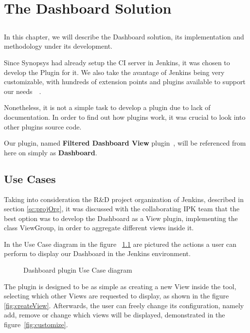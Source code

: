 \chapter{The Dashboard Solution}\label{ch:solution}

\section*{}

In this chapter, we will describe the Dashboard solution, its implementation and methodology under its development.

Since Synopsys had already setup the CI server in Jenkins, it was chosen to develop the Plugin for it. We also take the avantage of Jenkins being very customizable, with hundreds of extension points and plugins available to support our needs~\cite{kn:Jenkins}~\cite{jnks:extensionpoints}.

Nonetheless, it is not a simple task to develop a plugin due to lack of documentation. In order to find out how plugins work, it was crucial to look into other plugins source code.

Our plugin, named \textbf{Filtered Dashboard View} plugin~\cite{jksn:myplugin}, will be referenced from here on simply as \textbf{Dashboard}.

\section{Use Cases}\label{sc:usecases}

Taking into consideration the R\&D project organization of Jenkins, described in section \ref{sc:projOrg}, it was discussed with the collaborating IPK team that the best option was to develop the Dashboard as a View plugin, implementing the class ViewGroup, in order to aggregate different views inside it.

In the Use Case diagram in the figure ~\ref{fig:usecases} are pictured the actions a user can perform to display our Dashboard in the Jenkins environment. 

\newcommand{\code}{\texttt}



\begin{figure}
  \centering
      \caption{Dashboard plugin Use Case diagram}
      \label{fig:usecases}
\end{figure}  

The plugin is designed to be as simple as creating a new View inside the tool, selecting which other Views are requested to display, as shown in the figure \ref{fig:createView}. Afterwards, the user can freely change its configuration, namely add, remove or change which views will be displayed, demonstrated in the figure~\ref{fig:customize}.

